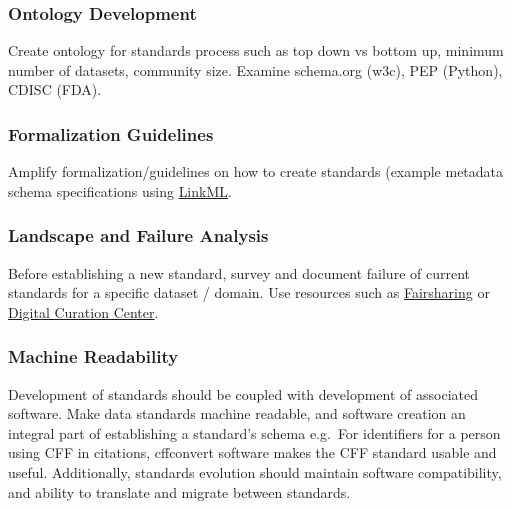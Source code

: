 \documentclass[
  letterpaper,
  DIV=11,
  numbers=noendperiod]{scrartcl}
\begin{document}
\subsubsection{Ontology Development}\label{ontology-development}

Create ontology for standards process such as top down vs bottom up,
minimum number of datasets, community size. Examine schema.org (w3c),
PEP (Python), CDISC (FDA).

\subsubsection{Formalization Guidelines}\label{formalization-guidelines}

Amplify formalization/guidelines on how to create standards (example
metadata schema specifications using \href{https://linkml.io}{LinkML}.

\subsubsection{Landscape and Failure
Analysis}\label{landscape-and-failure-analysis}

Before establishing a new standard, survey and document failure of
current standards for a specific dataset / domain. Use resources such as
\href{https://fairsharing.org/}{Fairsharing} or
\href{https://www.dcc.ac.uk/guidance/standards}{Digital Curation
Center}.

\subsubsection{Machine Readability}\label{machine-readability}

Development of standards should be coupled with development of
associated software. Make data standards machine readable, and software
creation an integral part of establishing a standard's schema e.g.~For
identifiers for a person using CFF in citations, cffconvert software
makes the CFF standard usable and useful. Additionally, standards
evolution should maintain software compatibility, and ability to
translate and migrate between standards.
\end{document}
